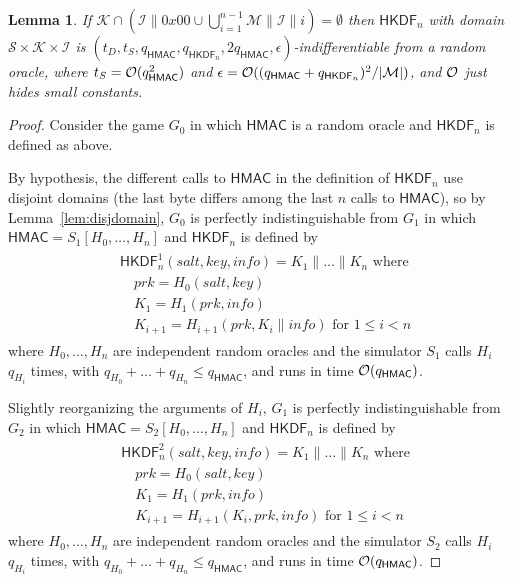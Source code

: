 \documentclass[compsoc, conference, letterpaper, 10pt, times]{IEEEtran}
\newcommand{\HKDF}{\mathsf{HKDF}}
\newtheorem{lemma}{Lemma}
\newcommand{\salt}{\mathit{salt}}
\newcommand{\key}{\mathit{key}}
\newcommand{\info}{\mathit{info}}
\newcommand{\prk}{\mathit{prk}}
\newcommand{\hmac}{\mathsf{HMAC}}
\newcommand{\Ssalt}{\mathcal{S}}
\newcommand{\Skey}{\mathcal{K}}
\newcommand{\Sinfo}{\mathcal{I}}
\newcommand{\Smac}{\mathcal{M}}
\newcommand{\ab}{\allowbreak}
\begin{document}
\begin{lemma}\label{lem:hkdfindif}
If $\Skey \cap (\Sinfo \| 0x00 \cup \bigcup_{i = 1}^{n-1}\Smac \| \Sinfo \| i) = \emptyset$
then $\HKDF_n$ with domain $\Ssalt \times \Skey \times \Sinfo$ is
$(t_D, \ab t_S, \ab q_{\hmac}, \ab q_{\HKDF_n}, \ab 2q_{\hmac}, \ab \epsilon)$-indifferentiable from a random oracle,
where $t_S = {\cal O}(q_{\hmac}^2)$ and $\epsilon = {\cal O}((q_{\hmac} + q_{\HKDF_n})^2/|\Smac|)$,
and ${\cal O}$ just hides small constants.
\end{lemma}
\begin{proof}
Consider the game $G_0$ in which $\hmac$ is a random oracle and $\HKDF_n$
is defined as above.

By hypothesis, the different calls to $\hmac$ in the definition of 
$\HKDF_n$ use disjoint domains (the last byte differs among the last
$n$ calls to $\hmac$), so by Lemma~\ref{lem:disjdomain}, $G_0$ is
perfectly indistinguishable from $G_1$ in which
$\hmac = S_1[H_0, \ldots, H_n]$ and $\HKDF_n$ is defined by
\begin{align*}
\begin{split}
&\HKDF^1_n(\salt,\key,\info) = K_1 \| \dots \| K_n \text{ where}\\
&\quad \prk = H_0(\salt,\key)\\
&\quad K_1 = H_1(\prk, \info )\\
&\quad K_{i+1} = H_{i+1}(\prk, K_i \| \info) \text{ for }1 \leq i < n
\end{split}
\end{align*}
where $H_0, \dots, H_n$ are independent random oracles
and the simulator $S_1$ calls $H_i$ $q_{H_i}$ times, with
$q_{H_0} + \dots + q_{H_n} \leq q_{\hmac}$, and runs in time 
${\cal O}(q_{\hmac})$.

Slightly reorganizing the arguments of $H_i$, $G_1$ is
perfectly indistinguishable from $G_2$ in which
$\hmac = S_2[H_0, \ldots, H_n]$ and $\HKDF_n$ is defined by
\begin{align*}
\begin{split}
&\HKDF^2_n(\salt,\key,\info) = K_1 \| \dots \| K_n \text{ where}\\
&\quad \prk = H_0(\salt,\key)\\
&\quad K_1 = H_1(\prk, \info )\\
&\quad K_{i+1} = H_{i+1}(K_i, \prk, \info) \text{ for }1 \leq i < n
\end{split}
\end{align*}
where $H_0, \dots, H_n$ are independent random oracles
and the simulator $S_2$ calls $H_i$ $q_{H_i}$ times, with
$q_{H_0} + \dots + q_{H_n} \leq q_{\hmac}$, and runs in time 
${\cal O}(q_{\hmac})$.


\end{proof}
\end{document}
